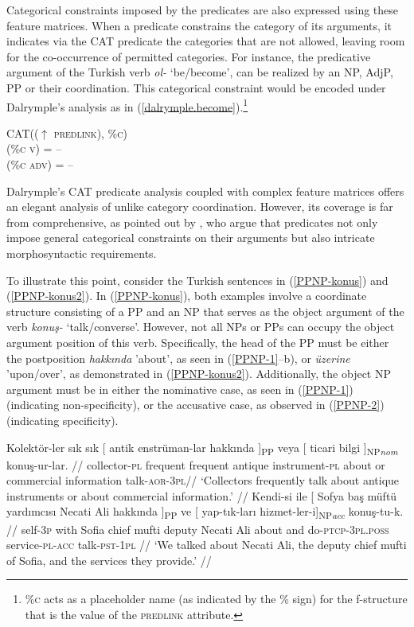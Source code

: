 Categorical constraints imposed by the predicates are also expressed using these feature matrices. When a predicate constrains the category of its arguments, it indicates via the CAT predicate the categories that are not allowed, leaving room for the co-occurrence of permitted categories. For instance, the predicative argument of the Turkish verb \textit{ol-} `be/become', can be realized by an NP, AdjP, PP or their coordination. This categorical constraint would be encoded under Dalrymple's analysis as in (\ref{dalrymple.become}).\footnote{\%\textsc{c} acts as a placeholder name (as indicated by the \% sign) for the f-structure that is the value of the \textsc{predlink} attribute.} 

\pex
\label{dalrymple.become}
CAT(($\uparrow$ \textsc{predlink}), \%\textsc{c})\\
(\%\textsc{c} \textsc{v}) = -- \\ 
(\%\textsc{c} \textsc{adv}) = -- 
\xe

Dalrymple's CAT predicate analysis coupled with complex feature matrices offers an elegant analysis of unlike category coordination. However, its coverage is far from comprehensive, as pointed out by \citet{prz:pat:21:oup}, who argue that predicates not only impose general categorical constraints on their arguments but also intricate morphosyntactic requirements.

To illustrate this point, consider the Turkish sentences in (\ref{PPNP-konus}) and (\ref{PPNP-konus2}). In (\ref{PPNP-konus}), both examples involve a coordinate structure consisting of a PP and an NP that serves as the object argument of the verb \textit{konuş-} `talk/converse'. However, not all NPs or PPs can occupy the object argument position of this verb. Specifically, the head of the PP must be either the postposition \textit{hakkında} 'about', as seen in (\ref{PPNP-1}--b), or \textit{üzerine} 'upon/over', as demonstrated in (\ref{PPNP-konus2}). Additionally, the object NP argument must be in either the nominative case, as seen in (\ref{PPNP-1}) (indicating non-specificity), or the accusative case, as observed in (\ref{PPNP-2}) (indicating specificity).

\pex[glspace=!1em,everygla={},everyglb={},aboveglbskip=-.15ex, interpartskip=15pt]
\label{PPNP-konus} 
\a\label{PPNP-1} \begingl
\gla Kolektör-ler sık sık {[} antik enstrüman-lar {hakkında ]\textsubscript{PP}} veya {[} ticari {bilgi ]\textsubscript{NP\textit{nom}}} konuş-ur-lar. //
\glb collector-\textsc{pl}  frequent frequent antique instrument-\textsc{pl} about or commercial information talk-\textsc{aor}-\textsc{3pl}//
\glft `Collectors frequently talk about antique instruments or about commercial information.' //
\endgl
\a\label{PPNP-2} \begingl
\gla Kendi-si ile {[} Sofya baş müftü yardımcısı Necati Ali {hakkında ]\textsubscript{PP}} ve {[} yap-tık-ları {hizmet-ler-i]\textsubscript{NP\textit{acc}}} konuş-tu-k. //
\glb self-\textsc{3p} with Sofia chief mufti deputy Necati Ali about and do-\textsc{ptcp}-\textsc{3pl.poss} service-\textsc{pl}-\textsc{acc} talk-\textsc{pst}-\textsc{1pl} //
\glft `We talked about Necati Ali, the deputy chief mufti of Sofia, and the services they provide.' //
\endgl
\xe

